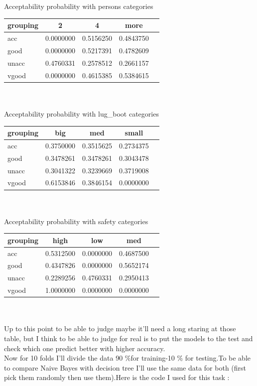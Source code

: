 \documentclass{article}
\begin{document}
\\\\Acceptability  probability with persons categories\\
\begin{tabular}{|l|*{4}{c|}}
	\hline
	grouping&2&4&more\\ \hline
acc&0.0000000&0.5156250&0.4843750\\ \hline
good&0.0000000&0.5217391&0.4782609\\ \hline
unacc&0.4760331&0.2578512&0.2661157\\ \hline
vgood&0.0000000&0.4615385&0.5384615\\ \hline
\end{tabular}
\\\\Acceptability  probability with lug\_boot categories\\
\begin{tabular}{|l|*{4}{c|}}
	\hline
	grouping&big&med&small\\ \hline
acc&0.3750000&0.3515625&0.2734375\\ \hline
good&0.3478261&0.3478261&0.3043478\\ \hline
unacc&0.3041322&0.3239669&0.3719008\\ \hline
vgood&0.6153846&0.3846154&0.0000000\\ \hline
\end{tabular}
\\\\Acceptability  probability with safety categories\\
\begin{tabular}{|l|*{4}{c|}}
	\hline
	grouping&high&low&med\\ \hline
acc&0.5312500&0.0000000&0.4687500\\ \hline
good&0.4347826&0.0000000&0.5652174\\ \hline
unacc&0.2289256&0.4760331&0.2950413\\ \hline
vgood&1.0000000&0.0000000&0.0000000\\ \hline
\end{tabular}\\ \\
Up to this point to be able to judge maybe it'll need a long staring at those table, but  I think to be able to judge for real is to put the models to the test and check which one predict better with higher accuracy.\\
Now for 10 folds I'll divide the data 90 \%for training-10 \% for testing.To be able to compare Naive Bayes with decision tree I'll use the same data for both (first pick them randomly then use them).Here is the code I used for this task :
\end{document}
